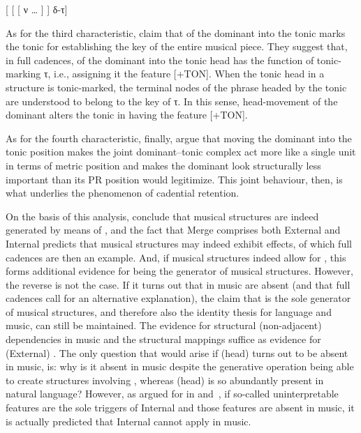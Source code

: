 \documentclass[output=paper]{langsci/langscibook}
\begin{document}
\ea\label{bkm:Ref348711137}
    {}[ [ [ ν \dots{} ]  ] δ-τ]
\z

As for the third characteristic, \citeauthor{KatzPes2011} claim that 
of the dominant into the tonic marks the tonic for establishing the key of the
entire musical piece. They suggest that, in full cadences,  of the
dominant into the tonic head has the function of tonic-marking τ, i.e.,
assigning it the feature [+TON]. When the tonic head in a structure is
tonic-marked, the terminal nodes of the phrase headed by the tonic are
understood to belong to the key of τ. In this sense, head-movement of the
dominant alters the tonic in having the feature [+TON].

As for the fourth characteristic, finally, \citeauthor{KatzPes2011} argue that
moving the dominant into the tonic position makes the joint dominant–tonic
complex act more like a single unit in terms of metric position and makes the
dominant look structurally less important than its \gls{PR} position would
legitimize. This joint behaviour, then, is what underlies the phenomenon of
cadential retention.

On the basis of this analysis, \citeauthor{KatzPes2011} conclude that musical
structures are indeed generated by means of , and the fact that
Merge comprises both External and Internal  predicts that musical
structures may indeed exhibit  effects, of which full cadences are then
an example.  And, if musical structures indeed allow for , this forms
additional evidence for  being the generator of musical structures.
However, the reverse is not the case. If it turns out that  in
music are absent (and that full cadences call for an alternative explanation),
the claim that  is the sole generator of musical structures, and therefore
also the identity thesis for language and music, can still be maintained. The
evidence for structural (non-adjacent) dependencies in music and the structural
mappings suffice as evidence for (External) . The only question that
would arise if (head)  turns out to be absent in music, is: why
is it absent in music despite the generative operation  being able
to create structures involving , whereas (head)  is
so abundantly present in natural language? However, as argued for in
 and~, if so-called uninterpretable features are the
sole triggers of Internal  and those features are absent in music,
it is actually predicted that Internal  cannot apply in music.
\end{document}
